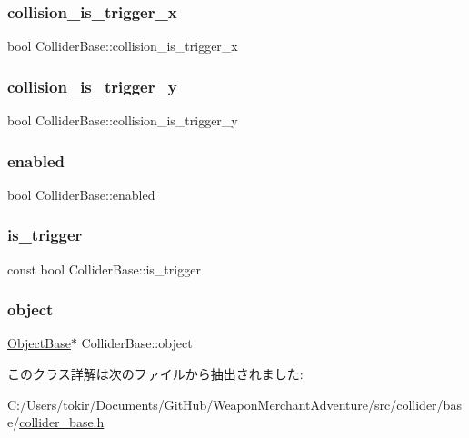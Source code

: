 \subsubsection{\texorpdfstring{collision\+\_\+is\+\_\+trigger\+\_\+x}{collision\_is\_trigger\_x}}
{\footnotesize\ttfamily bool Collider\+Base\+::collision\+\_\+is\+\_\+trigger\+\_\+x}

\mbox{\label{class_collider_base_a920eaa089f531e1e62b1ce8898b46453}} 
\subsubsection{\texorpdfstring{collision\+\_\+is\+\_\+trigger\+\_\+y}{collision\_is\_trigger\_y}}
{\footnotesize\ttfamily bool Collider\+Base\+::collision\+\_\+is\+\_\+trigger\+\_\+y}

\mbox{\label{class_collider_base_a812053f247dc6357357bdf9353dded77}} 
\subsubsection{\texorpdfstring{enabled}{enabled}}
{\footnotesize\ttfamily bool Collider\+Base\+::enabled}

\mbox{\label{class_collider_base_a0664409b8b88719fd5ac4bd350ea3b8f}} 
\subsubsection{\texorpdfstring{is\+\_\+trigger}{is\_trigger}}
{\footnotesize\ttfamily const bool Collider\+Base\+::is\+\_\+trigger}

\mbox{\label{class_collider_base_a63adac6a75877857abe9ff2cf4274157}} 
\subsubsection{\texorpdfstring{object}{object}}
{\footnotesize\ttfamily \mbox{\hyperlink{class_object_base}{Object\+Base}}$\ast$ Collider\+Base\+::object}



このクラス詳解は次のファイルから抽出されました\+:\begin{DoxyCompactItemize}
\item 
C\+:/\+Users/tokir/\+Documents/\+Git\+Hub/\+Weapon\+Merchant\+Adventure/src/collider/base/\mbox{\hyperlink{collider__base_8h}{collider\+\_\+base.\+h}}\end{DoxyCompactItemize}
